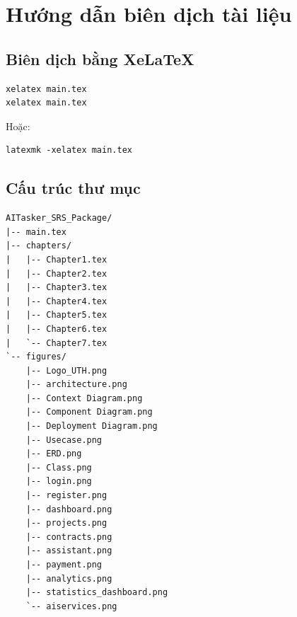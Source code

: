 \documentclass[12pt,a4paper,oneside]{report}
\begin{document}
\appendix
\renewcommand{\chaptername}{PHỤ LỤC}

\chapter{Hướng dẫn biên dịch tài liệu}
\label{chap:appendix}

\section{Biên dịch bằng XeLaTeX}

\begin{lstlisting}
xelatex main.tex
xelatex main.tex
\end{lstlisting}

Hoặc:

\begin{lstlisting}
latexmk -xelatex main.tex
\end{lstlisting}

\section{Cấu trúc thư mục}

\begin{lstlisting}
AITasker_SRS_Package/
|-- main.tex
|-- chapters/
|   |-- Chapter1.tex
|   |-- Chapter2.tex
|   |-- Chapter3.tex
|   |-- Chapter4.tex
|   |-- Chapter5.tex
|   |-- Chapter6.tex
|   `-- Chapter7.tex
`-- figures/
    |-- Logo_UTH.png
    |-- architecture.png
    |-- Context Diagram.png
    |-- Component Diagram.png
    |-- Deployment Diagram.png
    |-- Usecase.png
    |-- ERD.png
    |-- Class.png
    |-- login.png
    |-- register.png
    |-- dashboard.png
    |-- projects.png
    |-- contracts.png
    |-- assistant.png
    |-- payment.png
    |-- analytics.png
    |-- statistics_dashboard.png
    `-- aiservices.png
\end{lstlisting}
\end{document}

